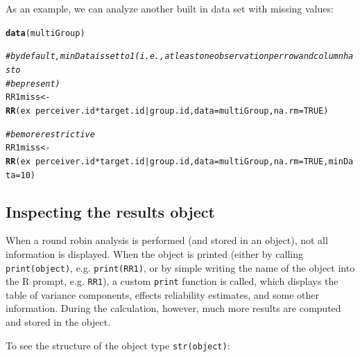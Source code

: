 \documentclass[a4paper]{article}\usepackage[]{graphicx}\usepackage[]{color}
\makeatletter
\newcommand{\hlnum}[1]{\textcolor[rgb]{0.686,0.059,0.569}{#1}}%
\newcommand{\hlcom}[1]{\textcolor[rgb]{0.678,0.584,0.686}{\textit{#1}}}%
\newcommand{\hlopt}[1]{\textcolor[rgb]{0,0,0}{#1}}%
\newcommand{\hlstd}[1]{\textcolor[rgb]{0.345,0.345,0.345}{#1}}%
\newcommand{\hlkwb}[1]{\textcolor[rgb]{0.69,0.353,0.396}{#1}}%
\newcommand{\hlkwc}[1]{\textcolor[rgb]{0.333,0.667,0.333}{#1}}%
\newcommand{\hlkwd}[1]{\textcolor[rgb]{0.737,0.353,0.396}{\textbf{#1}}}%
\newenvironment{kframe}{%
 \def\at@end@of@kframe{}%
 \ifinner\ifhmode%
  \def\at@end@of@kframe{\end{minipage}}%
  \begin{minipage}{\columnwidth}%
 \fi\fi%
 \def\FrameCommand##1{\hskip\@totalleftmargin \hskip-\fboxsep
 \colorbox{shadecolor}{##1}\hskip-\fboxsep
     \hskip-\linewidth \hskip-\@totalleftmargin \hskip\columnwidth}%
 \MakeFramed {\advance\hsize-\width
   \@totalleftmargin\z@ \linewidth\hsize
   \@setminipage}}%
 {\par\unskip\endMakeFramed%
 \at@end@of@kframe}
\newenvironment{knitrout}{}{} %
\makeatother
\begin{document}
As an example, we can analyze another built in data set with missing values:

\begin{knitrout}\small
{}\color{fgcolor}\begin{kframe}
\begin{alltt}
\hlkwd{data}\hlstd{(multiGroup)}

\hlcom{# by default, minData is set to 1 (i.e., at least one observation per row and column has to}
\hlcom{# be present)}
\hlstd{RR1miss} \hlkwb{<-} \hlkwd{RR}\hlstd{(ex} \hlopt{~} \hlstd{perceiver.id} \hlopt{*} \hlstd{target.id} \hlopt{|} \hlstd{group.id,} \hlkwc{data} \hlstd{= multiGroup,} \hlkwc{na.rm} \hlstd{=} \hlnum{TRUE}\hlstd{)}


\hlcom{# be more restrictive}
\hlstd{RR1miss} \hlkwb{<-} \hlkwd{RR}\hlstd{(ex} \hlopt{~} \hlstd{perceiver.id} \hlopt{*} \hlstd{target.id} \hlopt{|} \hlstd{group.id,} \hlkwc{data} \hlstd{= multiGroup,} \hlkwc{na.rm} \hlstd{=} \hlnum{TRUE}\hlstd{,} \hlkwc{minData} \hlstd{=} \hlnum{10}\hlstd{)}
\end{alltt}
\end{kframe}
\end{knitrout}






\subsection{Inspecting the results object} %
\label{sub:inspecting_the_results_object}
When a round robin analysis is performed (and stored in an object), not all information is displayed. When the object is printed (either by calling \texttt{print(object)}, e.g. \texttt{print(RR1)}, or by simple writing the name of the object into the R prompt, e.g. \texttt{RR1}), a custom \texttt{print} function is called, which displays the table of variance components, effects reliability estimates, and some other information. During the calculation, however, much more results are computed and stored in the object.

To see the structure of the object type \texttt{str(object)}:
\end{document}
